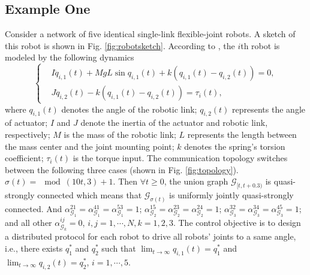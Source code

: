 \documentclass[12pt,draftcls,onecolumn]{IEEEtran}
\begin{document}
\subsection{Example One}
Consider a network of five identical single-link flexible-joint robots. A sketch of this robot is shown in Fig. \ref{fig:robotsketch}. According to \cite{Slotine91Book}, the $i$th robot is modeled by the following dynamics
\begin{equation}\label{equ:robotic}
\begin{cases}
& I\ddot{q}_{i,1}(t) + MgL\sin q_{i,1}(t) + k(q_{i,1}(t)-q_{i,2}(t)) = 0, \\
& J\ddot{q}_{i,2}(t) - k(q_{i,1}(t)-q_{i,2}(t)) = \tau_i(t),
\end{cases}
\end{equation}
where $q_{i,1}(t)$ denotes the angle of the robotic link; $q_{i,2}(t)$ represents the angle of actuator; $I$ and $J$ denote the inertia of the actuator and robotic link, respectively; $M$ is the mass of the robotic link; $L$ represents the length between the mass center and the joint mounting point; $k$ denotes the spring's torsion coefficient; $\tau_i(t)$ is the torque input. The communication topology switches between the following three cases (shown in Fig. \ref{fig:topology}). $\sigma(t) = \mod(10t,3)+1$. Then $\forall t \geq 0$, the union graph $\mathcal{G}_{[t,t+0.3)}$ is quasi-strongly connected which means that $\mathcal{G}_{\sigma(t)}$ is uniformly jointly quasi-strongly connected. And $\alpha^{21}_{\mathcal{G}_1} = \alpha^{41}_{\mathcal{G}_1} = \alpha^{53}_{\mathcal{G}_1} = 1$; $\alpha^{15}_{\mathcal{G}_2} = \alpha^{23}_{\mathcal{G}_2} = \alpha^{24}_{\mathcal{G}_2} = 1$; $\alpha^{32}_{\mathcal{G}_3} = \alpha^{34}_{\mathcal{G}_3} =\alpha^{45}_{\mathcal{G}_3} = 1$; and all other $ \alpha^{ij}_{\mathcal{G}_k} = 0$, $i,j=1,\cdots,N, k=1,2,3$.  The control objective is to design a distributed protocol for each robot to drive all robots' joints to a same angle, i.e., there exists $q^*_1$ and $q^*_2$ such that $\lim_{t\to\infty}q_{i,1}(t) = q^*_1$ and $\lim_{t\to\infty}q_{i,2}(t) = q^*_2$, $i=1,\cdots,5$.
\end{document}
